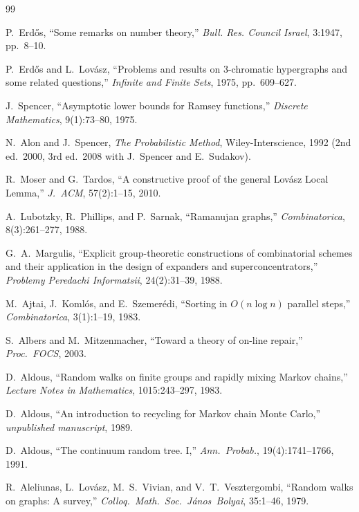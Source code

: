 \documentclass[twoside,12pt]{book}
\theoremstyle{plain}
\theoremstyle{definition}
\theoremstyle{remark}
\begin{document}
\begin{thebibliography}{99}

P.~Erd\H{o}s,
``Some remarks on number theory,''
\textit{Bull. Res. Council Israel}, 3:1947, pp.~8--10.

P.~Erd\H{o}s and L.~Lov\'{a}sz,
``Problems and results on $3$-chromatic hypergraphs and some related
questions,''
\textit{Infinite and Finite Sets}, 1975, pp.~609--627.

J.~Spencer,
``Asymptotic lower bounds for Ramsey functions,''
\textit{Discrete Mathematics}, 9(1):73--80, 1975.

N.~Alon and J.~Spencer,
\textit{The Probabilistic Method},
Wiley-Interscience, 1992 (2nd ed.~2000, 3rd ed.~2008 with J.~Spencer and
E.~Sudakov).

R.~Moser and G.~Tardos,
``A constructive proof of the general Lov\'{a}sz Local Lemma,''
\textit{J.~ACM}, 57(2):1--15, 2010.

A.~Lubotzky, R.~Phillips, and P.~Sarnak,
``Ramanujan graphs,''
\textit{Combinatorica}, 8(3):261--277, 1988.

G.~A.~Margulis,
``Explicit group-theoretic constructions of combinatorial schemes and
their application in the design of expanders and superconcentrators,''
\textit{Problemy Peredachi Informatsii}, 24(2):31--39, 1988.

M.~Ajtai, J.~Koml\'{o}s, and E.~Szemer\'{e}di,
``Sorting in $O(n \log n)$ parallel steps,''
\textit{Combinatorica}, 3(1):1--19, 1983.

S.~Albers and M.~Mitzenmacher,
``Toward a theory of on-line repair,''
\textit{Proc.~FOCS}, 2003.

D.~Aldous,
``Random walks on finite groups and rapidly mixing Markov chains,''
\textit{Lecture Notes in Mathematics}, 1015:243--297, 1983.

D.~Aldous,
``An introduction to recycling for Markov chain Monte Carlo,''
\textit{unpublished manuscript}, 1989.

D.~Aldous,
``The continuum random tree. I,''
\textit{Ann.~Probab.}, 19(4):1741--1766, 1991.

R.~Aleliunas, L.~Lov\'{a}sz, M.~S.~Vivian, and V.~T.~Vesztergombi,
``Random walks on graphs: A survey,''
\textit{Colloq.~Math.~Soc.~J\'{a}nos~Bolyai}, 35:1--46, 1979.


\end{thebibliography}
\end{document}

